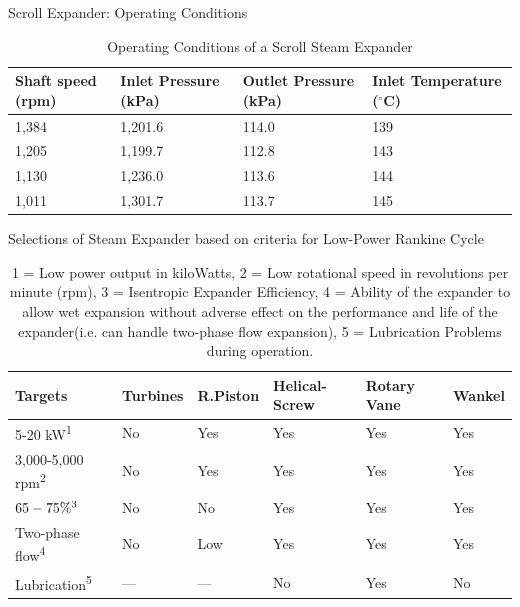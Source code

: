 \begin{frame}{Scroll Expander: Operating Conditions}
    \begin{table}[h]
    \centering
    \caption{Operating Conditions of a Scroll Steam Expander\cite{kim2007scroll}}
    \label{tab:scrollexpanderopcond}
    \begin{tabular}{p{2cm}p{2.5cm}p{2.5cm}p{2.5cm}}
    \hline
        Shaft speed (rpm) & Inlet Pressure (kPa) & Outlet Pressure (kPa) & Inlet Temperature ($^{\circ}$C) \\
    \hline
         1,384 & 1,201.6 & 114.0 & 139 \\
         1,205 & 1,199.7 & 112.8 & 143 \\
         1,130 & 1,236.0 & 113.6 & 144 \\
         1,011 & 1,301.7 & 113.7 & 145 \\
    \hline
    \end{tabular}
\end{table}
\end{frame}

\begin{frame}{Selections of Steam Expander based on criteria for Low-Power Rankine Cycle\cite{badr1991expansion}}
    \begin{table}[h]
    \centering
    \label{tab:steamexpanderselection}
    \begin{tabular}{p{3cm}p{1.25cm}p{1.25cm}p{1.25cm}p{1.225cm}p{1.5cm}}
    \hline
        Targets & Turbines & R.Piston & Helical-Screw & Rotary Vane & Wankel \\
    \hline
         5-20 kW\textsuperscript{1} & No & Yes & Yes & Yes & Yes \\
        3,000-5,000 rpm\textsuperscript{2} & No & Yes & Yes & Yes & Yes \\
        $65-75\%\textsuperscript{3}$ & No & No & Yes & Yes & Yes \\
        Two-phase flow\textsuperscript{4} & No & Low & Yes & Yes & Yes \\
        Lubrication\textsuperscript{5} & --- & --- & No & Yes & No \\
    \hline
    \end{tabular}
    \caption{\scriptsize 1 = Low power output in kiloWatts, 2 = Low rotational speed in revolutions per minute (rpm), 3 = Isentropic Expander Efficiency, 4 = Ability of the expander to allow wet expansion without adverse effect on the performance and life of the expander(i.e. can handle two-phase flow expansion), 5 = Lubrication Problems during operation.}
    \end{table}
\end{frame}

